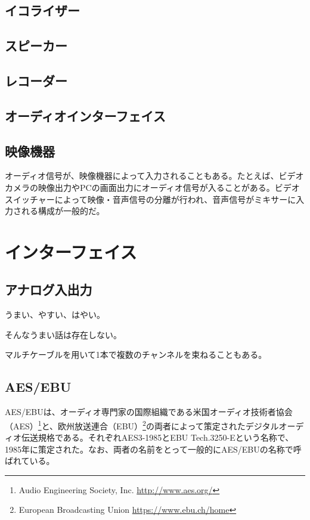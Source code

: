 \subsection{イコライザー}

\subsection{スピーカー}

\subsection{レコーダー}

\subsection{オーディオインターフェイス}

\subsection{映像機器}

オーディオ信号が、映像機器によって入力されることもある。たとえば、ビデオカメラの映像出力やPCの画面出力にオーディオ信号が入ることがある。ビデオスイッチャーによって映像・音声信号の分離が行われ、音声信号がミキサーに入力される構成が一般的だ。

\section{インターフェイス}
\label{sec:interface}

\subsection{アナログ入出力}

うまい、やすい、はやい。

そんなうまい話は存在しない。

マルチケーブルを用いて1本で複数のチャンネルを束ねることもある。

\subsection{AES/EBU}
\label{sec:aes/ebu}

AES/EBUは、オーディオ専門家の国際組織である米国オーディオ技術者協会（AES）\footnote{Audio Engineering Society, Inc. \url{http://www.aes.org/}}と、欧州放送連合（EBU）\footnote{European Broadcasting Union \url{https://www.ebu.ch/home}}の両者によって策定されたデジタルオーディオ伝送規格である。それぞれAES3-1985\cite{aes3-1985}とEBU Tech.3250-E\cite{ebutech-3250-e}という名称で、1985年に策定された。なお、両者の名前をとって一般的にAES/EBUの名称で呼ばれている。


